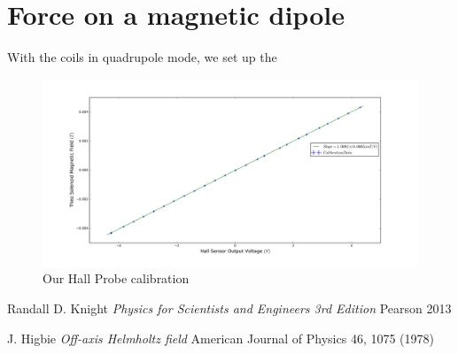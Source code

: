 \documentclass[aps,twocolumn,secnumarabic,balancelastpage,amsmath,amssymb,nofootinbib,floatfix]{revtex4-1}
\begin{document}
\section{Force on a magnetic dipole}
With the coils in quadrupole mode, we set up the 


\begin{turnpage}
\begin{figure}[here]
\includegraphics[height=0.70\textwidth]{../DataValidation/calibrationPlot}
\caption{Our Hall Probe calibration}
\label{apparatus}
\end{figure}
\end{turnpage}

\begin{thebibliography}{9}

	
	Randall D. Knight
	\emph{Physics for Scientists and Engineers 3rd Edition}
	Pearson 2013
	
	J. Higbie
	\emph{Off-axis Helmholtz field}
	American Journal of Physics 46, 1075 (1978)

	
	
\end{thebibliography}
\end{document}
